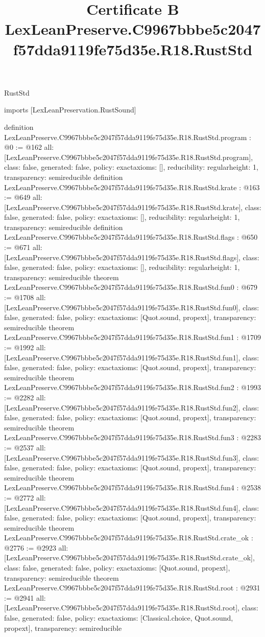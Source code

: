 \begin{lexlean}{RustStd}
\title{Certificate B LexLeanPreserve.C9967bbbe5c2047f57dda9119fe75d35e.R18.RustStd}
\begin{coremodule}
imports [LexLeanPreservation.RustSound]

definition LexLeanPreserve.C9967bbbe5c2047f57dda9119fe75d35e.R18.RustStd.program : @0 := @162 {
  all: [LexLeanPreserve.C9967bbbe5c2047f57dda9119fe75d35e.R18.RustStd.program],
  class: false,
  generated: false,
  policy: exact{axioms: []},
  reducibility: regular{height: 1},
  transparency: semireducible
}
definition LexLeanPreserve.C9967bbbe5c2047f57dda9119fe75d35e.R18.RustStd.krate : @163 := @649 {
  all: [LexLeanPreserve.C9967bbbe5c2047f57dda9119fe75d35e.R18.RustStd.krate],
  class: false,
  generated: false,
  policy: exact{axioms: []},
  reducibility: regular{height: 1},
  transparency: semireducible
}
definition LexLeanPreserve.C9967bbbe5c2047f57dda9119fe75d35e.R18.RustStd.flags : @650 := @671 {
  all: [LexLeanPreserve.C9967bbbe5c2047f57dda9119fe75d35e.R18.RustStd.flags],
  class: false,
  generated: false,
  policy: exact{axioms: []},
  reducibility: regular{height: 1},
  transparency: semireducible
}
theorem LexLeanPreserve.C9967bbbe5c2047f57dda9119fe75d35e.R18.RustStd.fun0 : @679 := @1708 {
  all: [LexLeanPreserve.C9967bbbe5c2047f57dda9119fe75d35e.R18.RustStd.fun0],
  class: false,
  generated: false,
  policy: exact{axioms: [Quot.sound, propext]},
  transparency: semireducible
}
theorem LexLeanPreserve.C9967bbbe5c2047f57dda9119fe75d35e.R18.RustStd.fun1 : @1709 := @1992 {
  all: [LexLeanPreserve.C9967bbbe5c2047f57dda9119fe75d35e.R18.RustStd.fun1],
  class: false,
  generated: false,
  policy: exact{axioms: [Quot.sound, propext]},
  transparency: semireducible
}
theorem LexLeanPreserve.C9967bbbe5c2047f57dda9119fe75d35e.R18.RustStd.fun2 : @1993 := @2282 {
  all: [LexLeanPreserve.C9967bbbe5c2047f57dda9119fe75d35e.R18.RustStd.fun2],
  class: false,
  generated: false,
  policy: exact{axioms: [Quot.sound, propext]},
  transparency: semireducible
}
theorem LexLeanPreserve.C9967bbbe5c2047f57dda9119fe75d35e.R18.RustStd.fun3 : @2283 := @2537 {
  all: [LexLeanPreserve.C9967bbbe5c2047f57dda9119fe75d35e.R18.RustStd.fun3],
  class: false,
  generated: false,
  policy: exact{axioms: [Quot.sound, propext]},
  transparency: semireducible
}
theorem LexLeanPreserve.C9967bbbe5c2047f57dda9119fe75d35e.R18.RustStd.fun4 : @2538 := @2772 {
  all: [LexLeanPreserve.C9967bbbe5c2047f57dda9119fe75d35e.R18.RustStd.fun4],
  class: false,
  generated: false,
  policy: exact{axioms: [Quot.sound, propext]},
  transparency: semireducible
}
theorem LexLeanPreserve.C9967bbbe5c2047f57dda9119fe75d35e.R18.RustStd.crate_ok : @2776 := @2923 {
  all: [LexLeanPreserve.C9967bbbe5c2047f57dda9119fe75d35e.R18.RustStd.crate_ok],
  class: false,
  generated: false,
  policy: exact{axioms: [Quot.sound, propext]},
  transparency: semireducible
}
theorem LexLeanPreserve.C9967bbbe5c2047f57dda9119fe75d35e.R18.RustStd.root : @2931 := @2941 {
  all: [LexLeanPreserve.C9967bbbe5c2047f57dda9119fe75d35e.R18.RustStd.root],
  class: false,
  generated: false,
  policy: exact{axioms: [Classical.choice, Quot.sound, propext]},
  transparency: semireducible
}


\end{coremodule}
\end{lexlean}

